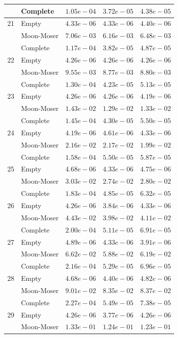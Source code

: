 \documentclass[12pt,a4paper]{article}
\begin{document}
\begin{longtable}{|l||l|l|l|l|}
  & Complete & $1.05e-04$ & $3.72e-05$ & $4.38e-05$ \\
  \hline
  21 & Empty & $4.33e-06$ & $4.33e-06$ & $4.40e-06$ \\
  & Moon-Moser & $7.06e-03$ & $6.16e-03$ & $6.48e-03$ \\
  & Complete & $1.17e-04$ & $3.82e-05$ & $4.87e-05$ \\
  \hline
  22 & Empty & $4.26e-06$ & $4.26e-06$ & $4.26e-06$ \\
  & Moon-Moser & $9.55e-03$ & $8.77e-03$ & $8.80e-03$ \\
  & Complete & $1.30e-04$ & $4.23e-05$ & $5.13e-05$ \\
  \hline
  23 & Empty & $4.26e-06$ & $4.26e-06$ & $4.19e-06$ \\
  & Moon-Moser & $1.43e-02$ & $1.29e-02$ & $1.33e-02$ \\
  & Complete & $1.45e-04$ & $4.30e-05$ & $5.50e-05$ \\
  \hline
  24 & Empty & $4.19e-06$ & $4.61e-06$ & $4.33e-06$ \\
  & Moon-Moser & $2.16e-02$ & $2.17e-02$ & $1.99e-02$ \\
  & Complete & $1.58e-04$ & $5.50e-05$ & $5.87e-05$ \\
  \hline
  25 & Empty & $4.68e-06$ & $4.33e-06$ & $4.75e-06$ \\
  & Moon-Moser & $3.03e-02$ & $2.74e-02$ & $2.80e-02$ \\
  & Complete & $1.83e-04$ & $4.85e-05$ & $6.32e-05$ \\
  \hline
  26 & Empty & $4.26e-06$ & $3.84e-06$ & $4.33e-06$ \\
  & Moon-Moser & $4.43e-02$ & $3.98e-02$ & $4.11e-02$ \\
  & Complete & $2.00e-04$ & $5.11e-05$ & $6.91e-05$ \\
  \hline
  27 & Empty & $4.89e-06$ & $4.33e-06$ & $3.91e-06$ \\
  & Moon-Moser & $6.62e-02$ & $5.88e-02$ & $6.19e-02$ \\
  & Complete & $2.16e-04$ & $5.29e-05$ & $6.96e-05$ \\
  \hline
  28 & Empty & $4.68e-06$ & $4.40e-06$ & $4.82e-06$ \\
  & Moon-Moser & $9.01e-02$ & $8.35e-02$ & $8.37e-02$ \\
  & Complete & $2.27e-04$ & $5.49e-05$ & $7.38e-05$ \\
  \hline
  29 & Empty & $4.26e-06$ & $3.77e-06$ & $4.26e-06$ \\
  & Moon-Moser & $1.33e-01$ & $1.24e-01$ & $1.23e-01$ \\

\end{longtable}
\end{document}
